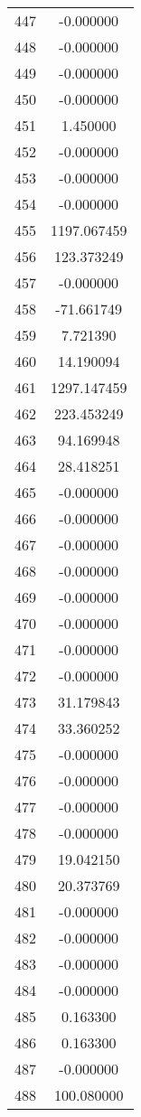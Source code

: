 \documentclass[12pt]{article}
\begin{document}
\begin{longtable}{@{}cc@{}}
447 & -0.000000 \\
448 & -0.000000 \\
449 & -0.000000 \\
450 & -0.000000 \\
451 & 1.450000 \\
452 & -0.000000 \\
453 & -0.000000 \\
454 & -0.000000 \\
455 & 1197.067459 \\
456 & 123.373249 \\
457 & -0.000000 \\
458 & -71.661749 \\
459 & 7.721390 \\
460 & 14.190094 \\
461 & 1297.147459 \\
462 & 223.453249 \\
463 & 94.169948 \\
464 & 28.418251 \\
465 & -0.000000 \\
466 & -0.000000 \\
467 & -0.000000 \\
468 & -0.000000 \\
469 & -0.000000 \\
470 & -0.000000 \\
471 & -0.000000 \\
472 & -0.000000 \\
473 & 31.179843 \\
474 & 33.360252 \\
475 & -0.000000 \\
476 & -0.000000 \\
477 & -0.000000 \\
478 & -0.000000 \\
479 & 19.042150 \\
480 & 20.373769 \\
481 & -0.000000 \\
482 & -0.000000 \\
483 & -0.000000 \\
484 & -0.000000 \\
485 & 0.163300 \\
486 & 0.163300 \\
487 & -0.000000 \\
488 & 100.080000 \\

\end{longtable}
\end{document}
